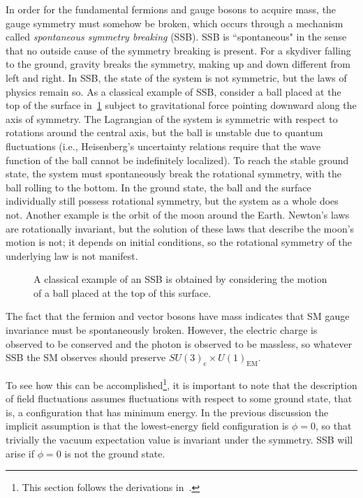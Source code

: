 In order for the fundamental fermions and gauge bosons to acquire mass, the
gauge symmetry must somehow be broken, which occurs through a mechanism called
\textit{spontaneous symmetry breaking} (SSB). SSB is ``spontaneous" in the sense
that no outside cause of the symmetry breaking is present. For a skydiver
falling to the ground, gravity breaks the symmetry, making up and down different
from left and right. In SSB, the state of the system is not symmetric, but the
laws of physics remain so. As a classical example of SSB, consider a ball placed
at the top of the surface in~\cref{fig:mexican_hat} subject to gravitational
force pointing downward along the axis of symmetry. The Lagrangian of the system
is symmetric with respect to rotations around the central axis, but the ball is
unstable due to quantum fluctuations (i.e., Heisenberg's uncertainty relations
require that the wave function of the ball cannot be indefinitely localized). To
reach the stable ground state, the system must spontaneously break the
rotational symmetry, with the ball rolling to the bottom. In the ground state,
the ball and the surface individually still possess rotational symmetry, but the
system as a whole does not. Another example is the orbit of the moon around the
Earth. Newton's laws are rotationally invariant, but the solution of these laws
that describe the moon's motion is not; it depends on initial conditions, so the
rotational symmetry of the underlying law is not manifest.

\begin{figure}[tb]
  
  \caption[Spontaneous symmetry breaking (classical example)]{
    A classical example of an SSB is obtained by considering the
    motion of a ball placed at the top of this surface.
  }
  \label{fig:mexican_hat}
\end{figure}

The fact that the fermion and vector bosons have mass indicates that SM gauge
invariance must be spontaneously broken. However, the electric charge is
observed to be conserved and the photon is observed to be massless, so whatever
SSB the SM observes should preserve $SU(3)_\text{c} \times U(1)_\text{EM}$.

To see how this can be accomplished\footnote{This section follows the
derivations
in~\cite{Griffiths:111880,Romanino:2009zz,cottingham1998introduction}.}, it is
important to note that the description of field fluctuations assumes
fluctuations with respect to some ground state, that is, a configuration that
has minimum energy. In the previous discussion the implicit assumption is that
the lowest-energy field configuration is $\phi=0$, so that trivially the vacuum
expectation value is invariant under the symmetry. SSB will arise if $\phi=0$ is
not the ground state.

